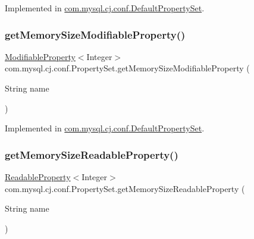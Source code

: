 Implemented in \mbox{\hyperlink{classcom_1_1mysql_1_1cj_1_1conf_1_1_default_property_set_ae3159cdeb5ee6bc987ca800feecef60c}{com.\+mysql.\+cj.\+conf.\+Default\+Property\+Set}}.

\mbox{\label{interfacecom_1_1mysql_1_1cj_1_1conf_1_1_property_set_a8cc24f5252be30243814c05679700586}} 
\subsubsection{\texorpdfstring{get\+Memory\+Size\+Modifiable\+Property()}{getMemorySizeModifiableProperty()}}
{\footnotesize\ttfamily \mbox{\hyperlink{interfacecom_1_1mysql_1_1cj_1_1conf_1_1_modifiable_property}{Modifiable\+Property}}$<$Integer$>$ com.\+mysql.\+cj.\+conf.\+Property\+Set.\+get\+Memory\+Size\+Modifiable\+Property (\begin{DoxyParamCaption}\item[{String}]{name }\end{DoxyParamCaption})}



Implemented in \mbox{\hyperlink{classcom_1_1mysql_1_1cj_1_1conf_1_1_default_property_set_a6c2860544a6fc9ea0c1aab92e1db6ae6}{com.\+mysql.\+cj.\+conf.\+Default\+Property\+Set}}.

\mbox{\label{interfacecom_1_1mysql_1_1cj_1_1conf_1_1_property_set_a0eca5d050976ad2291e7ac05bc8f4bf6}} 
\subsubsection{\texorpdfstring{get\+Memory\+Size\+Readable\+Property()}{getMemorySizeReadableProperty()}}
{\footnotesize\ttfamily \mbox{\hyperlink{interfacecom_1_1mysql_1_1cj_1_1conf_1_1_readable_property}{Readable\+Property}}$<$Integer$>$ com.\+mysql.\+cj.\+conf.\+Property\+Set.\+get\+Memory\+Size\+Readable\+Property (\begin{DoxyParamCaption}\item[{String}]{name }\end{DoxyParamCaption})}



